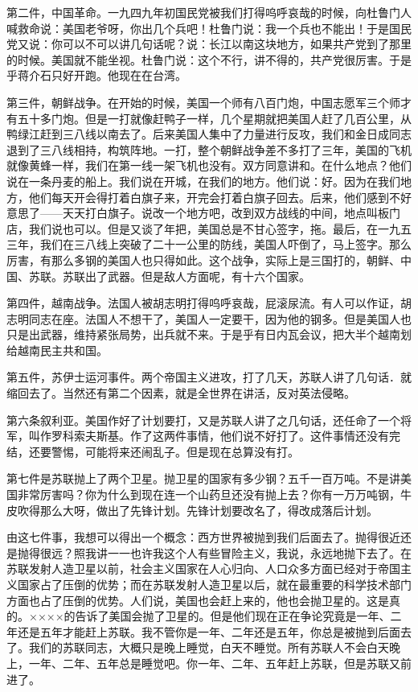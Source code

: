 第二件，中国革命。一九四九年初国民党被我们打得呜呼哀哉的时候，向杜鲁门人喊救命说：美国老爷呀，你出几个兵吧！杜鲁门说：我一个兵也不能出！于是国民党又说：你可以不可以讲几句话呢？说：长江以南这块地方，如果共产党到了那里的时候。美国就不能坐视。杜鲁门说：这个不行，讲不得的，共产党很厉害。于是乎蒋介石只好开跑。他现在在台湾。

第三件，朝鲜战争。在开始的时候，美国一个师有八百门炮，中国志愿军三个师才有五十多门炮。但是一打就像赶鸭子一样，几个星期就把美国人赶了几百公里，从鸭绿江赶到三八线以南去了。后来美国人集中了力量进行反攻，我们和金日成同志退到了三八线相持，构筑阵地。一打，整个朝鲜战争差不多打了三年，美国的飞机就像黄蜂一样，我们在第一线一架飞机也没有。双方同意讲和。在什么地点？他们说在一条丹麦的船上。我们说在开城，在我们的地方。他们说：好。因为在我们地方，他们每天开会得打着白旗子来，开完会打着白旗子回去。后来，他们感到不好意思了——天天打白旗子。说改一个地方吧，改到双方战线的中间，地点叫板门店，我们说也可以。但是又谈了年把，美国总是不甘心签字，拖。最后，在一九五三年，我们在三八线上突破了二十一公里的防线，美国人吓倒了，马上签字。那么厉害，有那么多钢的美国人也只得如此。这个战争，实际上是三国打的，朝鲜、中国、苏联。苏联出了武器。但是敌人方面呢，有十六个国家。

第四件，越南战争。法国人被胡志明打得呜呼哀哉，屁滚尿流。有人可以作证，胡志明同志在座。法国人不想干了，美国人一定要干，因为他的钢多。但是美国人也只是出武器，维持紧张局势，出兵就不来。于是乎有日内瓦会议，把大半个越南划给越南民主共和国。

第五件，苏伊士运河事件。两个帝国主义进攻，打了几天，苏联人讲了几句话．就缩回去了。当然还有第二个因素，就是全世界在讲活，反对英法侵略。

第六条叙利亚。美国作好了计划要打，又是苏联人讲了之几句话，还任命了一个将军，叫作罗科索夫斯基。作了这两件事情，他们说不好打了。这件事情还没有完结，还要警惕，可能将来还闹乱子。但是现在总算没有打。

第七件是苏联抛上了两个卫星。抛卫星的国家有多少钢？五千一百万吨。不是讲美国非常厉害吗？你为什么到现在连一个山药旦还没有抛上去？你有一万万吨钢，牛皮吹得那么大呀，做出了先锋计划。先锋计划要改名了，得改成落后计划。

由这七件事，我想可以得出一个概念：西方世界被抛到我们后面去了。抛得很近还是抛得很远？照我讲一一也许我这个人有些冒险主义，我说，永远地抛下去了。在苏联发射人造卫星以前，社会主义国家在人心归向、人口众多方面已经对于帝国主义国家占了压倒的优势；而在苏联发射人造卫星以后，就在最重要的科学技术部门方面也占了压倒的优势。人们说，美国也会赶上来的，他也会抛卫星的。这是真的。××××的告诉了美国会抛了卫星的。但是他们现在正在争论究竟是一年、二年还是五年才能赶上苏联。我不管你是一年、二年还是五年，你总是被抛到后面去了。我们的苏联同志，大概只是晚上睡觉，白天不睡觉。所有苏联人不会白天晚上，一年、二年、五年总是睡觉吧。你一年、二年、五年赶上苏联，但是苏联又前进了。

